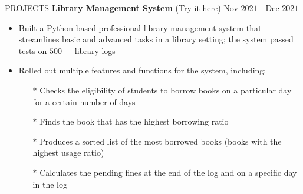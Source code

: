 \documentclass{resume} %
\begin{document}
\begin{rSection}{PROJECTS}
\textbf{Library Management System }{(\href{https://github.com/harshitjain17/Library-Management-System}{Try it here})} \hfill Nov $2021$ - Dec $2021$
\begin{itemize}[itemsep = -4pt]
    \item Built a Python-based professional library management system that streamlines basic and advanced tasks in a library setting; the system passed tests on $500+$ library logs
    \item Rolled out multiple features and functions for the system, including:
    \begin{itemize}[itemsep = -4pt]
        \item[$*$] Checks the eligibility of students to borrow books on a particular day for a certain number of days
        \item[$*$] Finds the book that has the highest borrowing ratio
        \item[$*$] Produces a sorted list of the most borrowed books (books with the highest usage ratio)
        \item[$*$] Calculates the pending fines at the end of the log and on a specific day in the log
    \end{itemize}
\end{itemize}

\end{rSection} 



 
\end{document}
